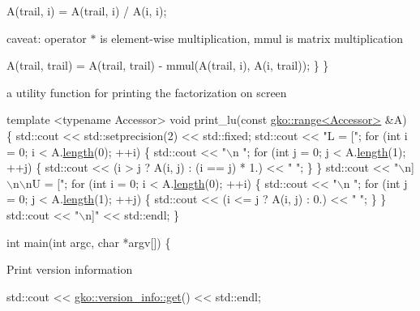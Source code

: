 \begin{DoxyCode}
A(trail, i) = A(trail, i) / A(i, i);
\end{DoxyCode}


caveat\+: operator $\ast$ is element-\/wise multiplication, mmul is matrix multiplication


\begin{DoxyCode}
        A(trail, trail) = A(trail, trail) - mmul(A(trail, i), A(i, trail));
    \}
\}
\end{DoxyCode}


a utility function for printing the factorization on screen


\begin{DoxyCode}
\textcolor{keyword}{template} <\textcolor{keyword}{typename} Accessor>
\textcolor{keywordtype}{void} print\_lu(\textcolor{keyword}{const} \hyperlink{classgko_1_1range}{gko::range<Accessor>} &A)
\{
    std::cout << std::setprecision(2) << std::fixed;
    std::cout << \textcolor{stringliteral}{"L = ["};
    \textcolor{keywordflow}{for} (\textcolor{keywordtype}{int} i = 0; i < A.\hyperlink{classgko_1_1range_a3ac8b238c377da9cc05d7c728efabfc8}{length}(0); ++i) \{
        std::cout << \textcolor{stringliteral}{"\(\backslash\)n  "};
        \textcolor{keywordflow}{for} (\textcolor{keywordtype}{int} j = 0; j < A.\hyperlink{classgko_1_1range_a3ac8b238c377da9cc05d7c728efabfc8}{length}(1); ++j) \{
            std::cout << (i > j ? A(i, j) : (i == j) * 1.) << \textcolor{stringliteral}{" "};
        \}
    \}
    std::cout << \textcolor{stringliteral}{"\(\backslash\)n]\(\backslash\)n\(\backslash\)nU = ["};
    \textcolor{keywordflow}{for} (\textcolor{keywordtype}{int} i = 0; i < A.\hyperlink{classgko_1_1range_a3ac8b238c377da9cc05d7c728efabfc8}{length}(0); ++i) \{
        std::cout << \textcolor{stringliteral}{"\(\backslash\)n  "};
        \textcolor{keywordflow}{for} (\textcolor{keywordtype}{int} j = 0; j < A.\hyperlink{classgko_1_1range_a3ac8b238c377da9cc05d7c728efabfc8}{length}(1); ++j) \{
            std::cout << (i <= j ? A(i, j) : 0.) << \textcolor{stringliteral}{" "};
        \}
    \}
    std::cout << \textcolor{stringliteral}{"\(\backslash\)n]"} << std::endl;
\}


\textcolor{keywordtype}{int} main(\textcolor{keywordtype}{int} argc, \textcolor{keywordtype}{char} *argv[])
\{
\end{DoxyCode}


Print version information


\begin{DoxyCode}
std::cout << \hyperlink{classgko_1_1version__info_a6daeb8a087cfb57fa055526fc133d8eb}{gko::version\_info::get}() << std::endl;
\end{DoxyCode}


